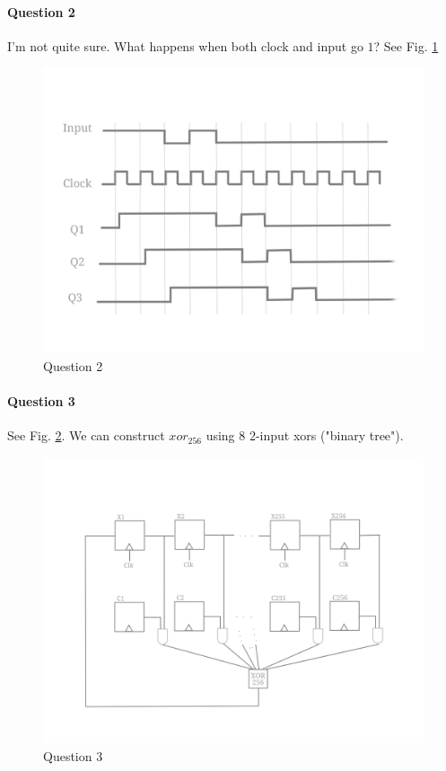 \paragraph{Question 2}
I'm not quite sure. 
What happens when both clock and input go $1$?
See Fig. \ref{fig:w17-4-2}
\begin{figure}[!h]
    \centering
    \includegraphics[scale=0.25]{data/2017-W-4-2.png}
    \caption{Question 2}
    \label{fig:w17-4-2}
\end{figure}

\paragraph{Question 3}
See Fig. \ref{fig:w17-4-3}. 
We can construct $xor_{256}$ using $8$ 2-input xors ("binary tree").
\begin{figure}[!h]
    \centering
    \includegraphics[scale=0.25]{data/2017-W-4-3.png}
    \caption{Question 3}
    \label{fig:w17-4-3}
\end{figure}


